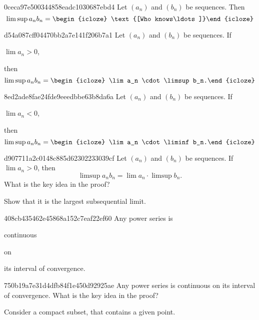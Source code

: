 \begin{note}{0ceca97e500344858eadc1030687ebd4}
    Let \({ (a_n) }\) and \({ (b_n) }\) be sequences.
    Then
    \[
        \limsup a_n b_n = \begin{icloze}{1}\text{[Who knows\ldots]}\end{icloze}
    \]
\end{note}

\begin{note}{d54a087cff04470bb2a7e141f206b7a1}
    Let \({ (a_n) }\) and \({ (b_n) }\) be sequences.
    If \begin{icloze}{2}\({ \lim a_n > 0 }\),\end{icloze} then
    \[
        \limsup a_n b_n = \begin{icloze}{1}\lim a_n \cdot \limsup b_n.\end{icloze}
    \]
\end{note}

\begin{note}{8ed2ade8fae24fde9eeedbbe63b8da6a}
    Let \({ (a_n) }\) and \({ (b_n) }\) be sequences.
    If \begin{icloze}{2}\({ \lim a_n < 0 }\),\end{icloze} then
    \[
        \limsup a_n b_n = \begin{icloze}{1}\lim a_n \cdot \liminf b_n.\end{icloze}
    \]
\end{note}

\begin{note}{d907711a2c0148c885d62302233039cf}
    Let \({ (a_n) }\) and \({ (b_n) }\) be sequences.
    If \({ \lim a_n > 0 }\), then
    \[
        \limsup a_n b_n = \lim a_n \cdot \limsup b_n.
    \]
    What is the key idea in the proof?

    \begin{cloze}{1}
        Show that it is the largest subsequential limit.
    \end{cloze}
\end{note}

\begin{note}{408cb435462e45868a152c7eaf22ef60}
    Any power series is \begin{icloze}{2}continuous\end{icloze} on \begin{icloze}{1}its interval of convergence.\end{icloze}
\end{note}

\begin{note}{750b19a7e31d4dfb84f1e450d92925ae}
    Any power series is continuous on its interval of convergence.
    What is the key idea in the proof?

    \begin{cloze}{1}
        Consider a compact subset, that contains a given point.
    \end{cloze}
\end{note}


